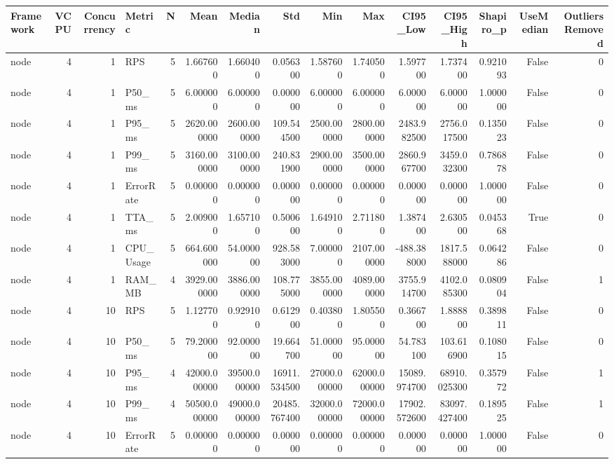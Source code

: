 \begin{tabular}{lrrlrrrrrrrrrrr}
\toprule
Framework & VCPU & Concurrency & Metric & N & Mean & Median & Std & Min & Max & CI95_Low & CI95_High & Shapiro_p & UseMedian & OutliersRemoved \\
\midrule
node & 4 & 1 & RPS & 5 & 1.667600 & 1.660400 & 0.056300 & 1.587600 & 1.740500 & 1.597700 & 1.737400 & 0.921093 & False & 0 \\
node & 4 & 1 & P50_ms & 5 & 6.000000 & 6.000000 & 0.000000 & 6.000000 & 6.000000 & 6.000000 & 6.000000 & 1.000000 & False & 0 \\
node & 4 & 1 & P95_ms & 5 & 2620.000000 & 2600.000000 & 109.544500 & 2500.000000 & 2800.000000 & 2483.982500 & 2756.017500 & 0.135023 & False & 0 \\
node & 4 & 1 & P99_ms & 5 & 3160.000000 & 3100.000000 & 240.831900 & 2900.000000 & 3500.000000 & 2860.967700 & 3459.032300 & 0.786878 & False & 0 \\
node & 4 & 1 & ErrorRate & 5 & 0.000000 & 0.000000 & 0.000000 & 0.000000 & 0.000000 & 0.000000 & 0.000000 & 1.000000 & False & 0 \\
node & 4 & 1 & TTA_ms & 5 & 2.009000 & 1.657100 & 0.500600 & 1.649100 & 2.711800 & 1.387400 & 2.630500 & 0.045368 & True & 0 \\
node & 4 & 1 & CPU_Usage & 5 & 664.600000 & 54.000000 & 928.583000 & 7.000000 & 2107.000000 & -488.388000 & 1817.588000 & 0.064286 & False & 0 \\
node & 4 & 1 & RAM_MB & 4 & 3929.000000 & 3886.000000 & 108.775000 & 3855.000000 & 4089.000000 & 3755.914700 & 4102.085300 & 0.080904 & False & 1 \\
node & 4 & 10 & RPS & 5 & 1.127700 & 0.929100 & 0.612900 & 0.403800 & 1.805500 & 0.366700 & 1.888800 & 0.389811 & False & 0 \\
node & 4 & 10 & P50_ms & 5 & 79.200000 & 92.000000 & 19.664700 & 51.000000 & 95.000000 & 54.783100 & 103.616900 & 0.108015 & False & 0 \\
node & 4 & 10 & P95_ms & 4 & 42000.000000 & 39500.000000 & 16911.534500 & 27000.000000 & 62000.000000 & 15089.974700 & 68910.025300 & 0.357972 & False & 1 \\
node & 4 & 10 & P99_ms & 4 & 50500.000000 & 49000.000000 & 20485.767400 & 32000.000000 & 72000.000000 & 17902.572600 & 83097.427400 & 0.189525 & False & 1 \\
node & 4 & 10 & ErrorRate & 5 & 0.000000 & 0.000000 & 0.000000 & 0.000000 & 0.000000 & 0.000000 & 0.000000 & 1.000000 & False & 0 \\

\end{tabular}
